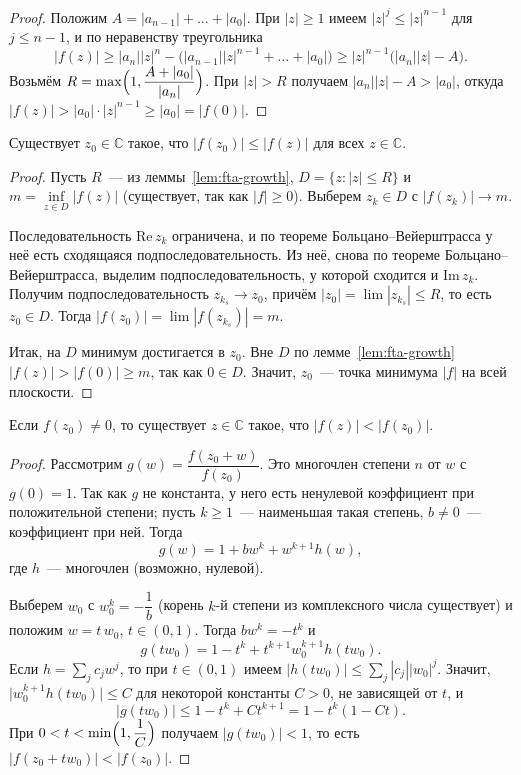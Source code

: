 \documentclass[12pt]{article}
\begin{document}
	\begin{proof}
		Положим $A = |a_{n-1}| + \dots + |a_0|$. При $|z| \geqslant 1$ имеем $|z|^j \leqslant |z|^{n-1}$ для $j \leqslant n - 1$, и по неравенству треугольника
		\[
			|f(z)| \geqslant |a_n| |z|^n - \bigl(|a_{n-1}| |z|^{n-1} + \dots + |a_0|\bigr) \geqslant |z|^{n-1} \bigl(|a_n| |z| - A\bigr).
		\]
		Возьмём $R = \max\Bigl(1, \dfrac{A + |a_0|}{|a_n|}\Bigr)$. При $|z| > R$ получаем $|a_n||z| - A > |a_0|$, откуда $|f(z)| > |a_0| \cdot |z|^{n-1} \geqslant |a_0| = |f(0)|$.
	\end{proof}

	\begin{lemma}\label{lem:fta-min}
		Существует $z_0 \in \mathbb{C}$ такое, что $|f(z_0)| \leqslant |f(z)|$ для всех $z \in \mathbb{C}$.
	\end{lemma}

	\begin{proof}
		Пусть $R$~--- из леммы~\ref{lem:fta-growth}, $D = \{ z : |z| \leqslant R \}$ и $m = \inf\limits_{z \in D} |f(z)|$ (существует, так как $|f| \geqslant 0$). Выберем $z_k \in D$ с $|f(z_k)| \to m$.

		Последовательность $\mathrm{Re}\, z_k$ ограничена, и по теореме Больцано--Вейерштрасса у неё есть сходящаяся подпоследовательность. Из неё, снова по теореме Больцано--Вейерштрасса, выделим подпоследовательность, у которой сходится и $\mathrm{Im}\, z_k$. Получим подпоследовательность $z_{k_s} \to z_0$, причём $|z_0| = \lim |z_{k_s}| \leqslant R$, то есть $z_0 \in D$. Тогда $|f(z_0)| = \lim |f(z_{k_s})| = m$.

		Итак, на $D$ минимум достигается в $z_0$. Вне $D$ по лемме~\ref{lem:fta-growth} $|f(z)| > |f(0)| \geqslant m$, так как $0 \in D$. Значит, $z_0$~--- точка минимума $|f|$ на всей плоскости.
	\end{proof}

	\begin{lemma}[Даламбера]\label{lem:dalembert}
		Если $f(z_0) \ne 0$, то существует $z \in \mathbb{C}$ такое, что $|f(z)| < |f(z_0)|$.
	\end{lemma}

	\begin{proof}
		Рассмотрим $g(w) = \dfrac{f(z_0 + w)}{f(z_0)}$. Это многочлен степени $n$ от $w$ с $g(0) = 1$. Так как $g$ не константа, у него есть ненулевой коэффициент при положительной степени; пусть $k \geqslant 1$~--- наименьшая такая степень, $b \ne 0$~--- коэффициент при ней. Тогда
		\[
			g(w) = 1 + b w^k + w^{k+1} h(w),
		\]
		где $h$~--- многочлен (возможно, нулевой).

		Выберем $w_0$ с $w_0^k = -\dfrac{1}{b}$ (корень $k$-й степени из комплексного числа существует) и положим $w = t\,w_0$, $t \in (0, 1)$. Тогда $b w^k = -t^k$ и
		\[
			g(t w_0) = 1 - t^k + t^{k+1} w_0^{k+1} h(t w_0).
		\]
		Если $h = \sum_j c_j w^j$, то при $t \in (0, 1)$ имеем $|h(t w_0)| \leqslant \sum_j |c_j| |w_0|^j$. Значит, $\bigl|w_0^{k+1} h(t w_0)\bigr| \leqslant C$ для некоторой константы $C > 0$, не зависящей от $t$, и
		\[
			|g(t w_0)| \leqslant 1 - t^k + C t^{k+1} = 1 - t^k (1 - C t).
		\]
		При $0 < t < \min\Bigl(1, \dfrac{1}{C}\Bigr)$ получаем $|g(t w_0)| < 1$, то есть $|f(z_0 + t w_0)| < |f(z_0)|$.
	\end{proof}
\end{document}
